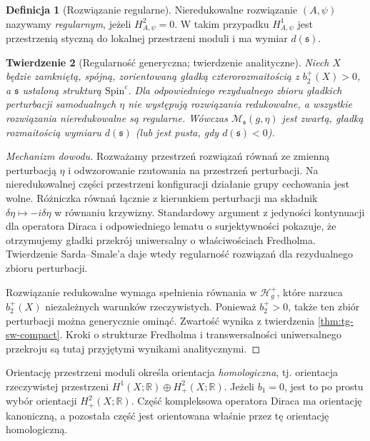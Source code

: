\documentclass[11pt,a4paper]{report}
\numberwithin{equation}{section}
\theoremstyle{plain}
\newtheorem{twierdzenie}{Twierdzenie}[section]
\theoremstyle{definition}
\newtheorem{definicja}[twierdzenie]{Definicja}
\theoremstyle{remark}
\begin{document}
\begin{definicja}[Rozwiązanie regularne]
Nieredukowalne rozwiązanie $(A,\psi)$ nazywamy
\emph{regularnym}, jeżeli $H^2_{A,\psi}=0$.
W takim przypadku $H^1_{A,\psi}$ jest przestrzenią
styczną do lokalnej przestrzeni moduli i ma wymiar
$d(\mathfrak s)$.
\end{definicja}

\begin{twierdzenie}[Regularność generyczna; twierdzenie analityczne]
\label{thm:tg-sw-generic}
Niech $X$ będzie zamkniętą, spójną, zorientowaną
gładką czterorozmaitością z $b_2^+(X)>0$,
a $\mathfrak s$ ustaloną strukturą $\mathrm{Spin}^c$.
Dla odpowiedniego rezydualnego zbioru gładkich perturbacji
samodualnych $\eta$ nie występują rozwiązania redukowalne,
a wszystkie rozwiązania nieredukowalne są regularne.
Wówczas $\mathcal M_{\mathfrak s}(g,\eta)$ jest zwartą,
gładką rozmaitością wymiaru $d(\mathfrak s)$
(lub jest pusta, gdy $d(\mathfrak s)<0$).
\end{twierdzenie}

\begin{proof}[Mechanizm dowodu]
Rozważamy przestrzeń rozwiązań równań ze zmienną
perturbacją $\eta$ i odwzorowanie rzutowania na przestrzeń
perturbacji. Na nieredukowalnej części przestrzeni konfiguracji
działanie grupy cechowania jest wolne. Różniczka równań
łącznie z kierunkiem perturbacji ma składnik
$\delta\eta\mapsto-i\delta\eta$ w równaniu krzywizny.
Standardowy argument z jedyności kontynuacji dla operatora
Diraca i odpowiedniego lematu o surjektywności pokazuje,
że otrzymujemy gładki przekrój uniwersalny o właściwościach
Fredholma. Twierdzenie Sarda--Smale'a daje wtedy regularność
rozwiązań dla rezydualnego zbioru perturbacji.

Rozwiązanie redukowalne wymaga spełnienia równania w
$\mathcal H_g^+$, które narzuca $b_2^+(X)$ niezależnych
warunków rzeczywistych. Ponieważ $b_2^+>0$, także ten
zbiór perturbacji można generycznie ominąć.
Zwartość wynika z twierdzenia \ref{thm:tg-sw-compact}.
Kroki o strukturze Fredholma i transwersalności uniwersalnego
przekroju są tutaj przyjętymi wynikami analitycznymi.
\end{proof}

Orientację przestrzeni moduli określa orientacja
\emph{homologiczna}, tj. orientacja rzeczywistej
przestrzeni $H^1(X;\mathbb R)\oplus H^2_+(X;\mathbb R)$.
Jeżeli $b_1=0$, jest to po prostu wybór orientacji
$H^2_+(X;\mathbb R)$. Część kompleksowa operatora Diraca
ma orientację kanoniczną, a pozostała część jest orientowana
właśnie przez tę orientację homologiczną.
\end{document}
